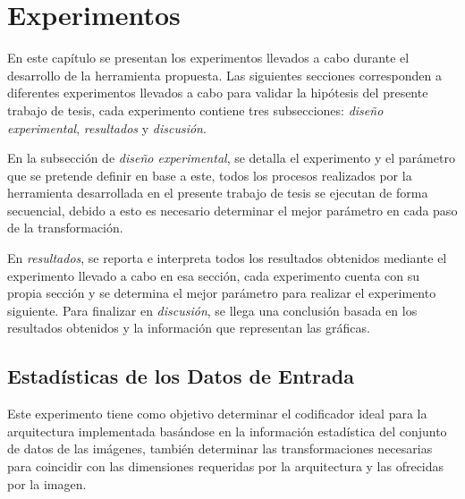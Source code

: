 \chapter{Experimentos}
En este capítulo se presentan los experimentos llevados a cabo durante el desarrollo de la herramienta propuesta. Las siguientes secciones corresponden a diferentes experimentos llevados a cabo para validar la hipótesis del presente trabajo de tesis, cada experimento contiene tres subsecciones: \emph{diseño experimental}, \emph{resultados} y \emph{discusión}.

En la subsección de \emph{diseño experimental}, se detalla el experimento y el parámetro que se pretende definir en base a este, todos los procesos realizados por la herramienta desarrollada en el presente trabajo de tesis se ejecutan de forma secuencial, debido a esto es necesario determinar el mejor parámetro en cada paso de la transformación.

En \emph{resultados}, se reporta e interpreta todos los resultados obtenidos mediante el experimento llevado a cabo en esa sección, cada experimento cuenta con su propia sección y se determina el mejor parámetro para realizar el experimento siguiente. Para finalizar en \emph{discusión}, se llega una conclusión basada en los resultados obtenidos y la información que representan las gráficas.


\section{Estadísticas de los Datos de Entrada} 
Este experimento tiene como objetivo determinar el codificador ideal para la arquitectura implementada basándose en la información estadística del conjunto de datos de las imágenes, también determinar las transformaciones necesarias para coincidir con las dimensiones requeridas por la arquitectura y las ofrecidas por la imagen.


